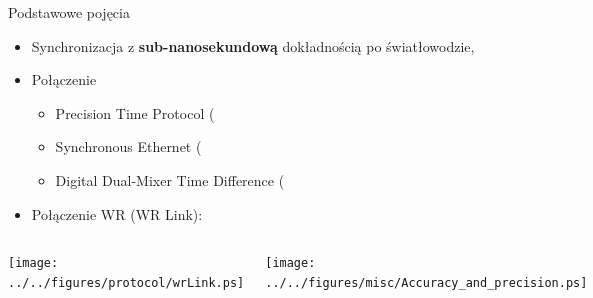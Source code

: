 \documentclass[compress,red]{beamer}
\begin{document}
\begin{frame}{Podstawowe pojęcia}

  \begin{itemize}
    \item Synchronizacja z {\bf sub-nanosekundową} dokładnością po światłowodzie,
    \item Połączenie
	\begin{itemize}
	  \item Precision Time Protocol (\color{blue}{PTP}\color{black}{) - synchronizacja,}
	  \item Synchronous Ethernet (\color{blue}{SyncE}\color{black}{) syntonizacja,}
	  \item Digital Dual-Mixer Time Difference (\color{blue}{DDMTD}\color{black}{) - pomiar fazy,}

	\end{itemize}
    \item Połączenie WR (WR Link):
  \end{itemize}

\begin{columns}[c]

  \begin{center}
  \texttt{[image: ../../figures/protocol/wrLink.ps]}
  \end{center}

  \vspace{2cm}


  \begin{center}
  \texttt{[image: ../../figures/misc/Accuracy\_and\_precision.ps]}
  \end{center}

  \vspace{1cm}

\end{columns}


\end{frame}
\end{document}
